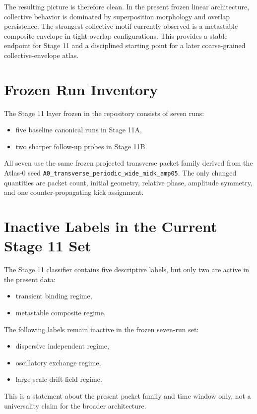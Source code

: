 \documentclass[11pt]{article}
\begin{document}
The resulting picture is therefore clean. In the present frozen linear architecture, collective behavior is dominated by superposition morphology and overlap persistence. The strongest collective motif currently observed is a metastable composite envelope in tight-overlap configurations. This provides a stable endpoint for Stage 11 and a disciplined starting point for a later coarse-grained collective-envelope atlas.

\appendix
\section{Frozen Run Inventory}
The Stage 11 layer frozen in the repository consists of seven runs:
\begin{itemize}
\item five baseline canonical runs in Stage 11A,
\item two sharper follow-up probes in Stage 11B.
\end{itemize}
All seven use the same frozen projected transverse packet family derived from the Atlas-0 seed \texttt{A0\_transverse\_periodic\_wide\_midk\_amp05}. The only changed quantities are packet count, initial geometry, relative phase, amplitude symmetry, and one counter-propagating kick assignment.

\section{Inactive Labels in the Current Stage 11 Set}
The Stage 11 classifier contains five descriptive labels, but only two are active in the present data:
\begin{itemize}
\item transient binding regime,
\item metastable composite regime.
\end{itemize}
The following labels remain inactive in the frozen seven-run set:
\begin{itemize}
\item dispersive independent regime,
\item oscillatory exchange regime,
\item large-scale drift field regime.
\end{itemize}
This is a statement about the present packet family and time window only, not a universality claim for the broader architecture.
\end{document}
